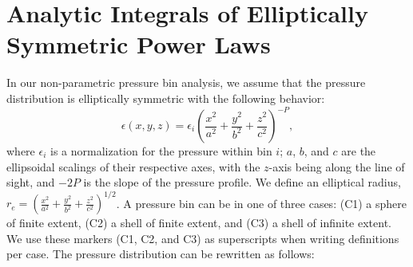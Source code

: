 \documentclass[twocolumn,traditabstract]{aa}
\begin{document}

\appendix

\section{Analytic Integrals of Elliptically Symmetric Power Laws}
\label{sec:analytic_integrals}

In our non-parametric pressure bin analysis, we assume that the pressure distribution is elliptically symmetric
with the following behavior:
\begin{equation}
  \epsilon(x,y,z) = \epsilon_i (\frac{x^2}{a^2}+\frac{y^2}{b^2}+\frac{z^2}{c^2})^{-P},
\end{equation}
where $\epsilon_i$ is a normalization for the pressure within bin $i$;
$a$, $b$, and $c$ are the ellipsoidal scalings of their respective axes,
with the $z$-axis being along the line of sight, and $-2P$ is the slope of the pressure profile. We define an
elliptical radius, $r_e = (\frac{x^2}{a^2}+\frac{y^2}{b^2}+\frac{z^2}{c^2})^{1/2}$.
A pressure bin can be in one of three cases: (C1) a sphere of finite extent, (C2) a shell of
finite extent, and (C3) a shell of infinite extent. We use these markers (C1, C2, and C3) as superscripts
when writing definitions per case. The pressure distribution can be rewritten as follows:
\end{document}
